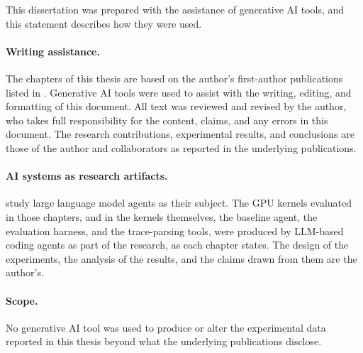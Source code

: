 This dissertation was prepared with the assistance of generative AI tools, and this statement describes how they were used.

\paragraph{Writing assistance.}
The chapters of this thesis are based on the author's first-author publications listed in .
Generative AI tools were used to assist with the writing, editing, and formatting of this document.
All text was reviewed and revised by the author, who takes full responsibility for the content, claims, and any errors in this document.
The research contributions, experimental results, and conclusions are those of the author and collaborators as reported in the underlying publications.

\paragraph{AI systems as research artifacts.}
 study large language model agents as their subject.
The GPU kernels evaluated in those chapters, and in  the kernels themselves, the baseline agent, the evaluation harness, and the trace-parsing tools, were produced by LLM-based coding agents as part of the research, as each chapter states.
The design of the experiments, the analysis of the results, and the claims drawn from them are the author's.

\paragraph{Scope.}
No generative AI tool was used to produce or alter the experimental data reported in this thesis beyond what the underlying publications disclose.
